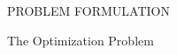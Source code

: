\documentclass[10pt, conference, letterpaper]{IEEEtran}
\newcommand{\define}{\triangleq}
\newcommand{\jSpace}{\mathcal{J}}
\begin{document}
\begin{section}{PROBLEM FORMULATION}
\begin{subsection}{The Optimization Problem}
            

\end{subsection}
\end{section}
\end{document}
